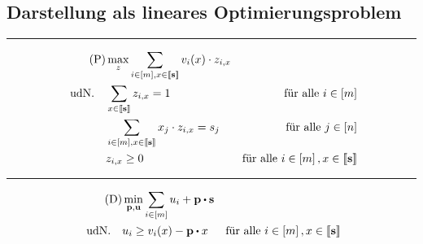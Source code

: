 \subsection{Darstellung als lineares Optimierungsproblem}
\begin{frame}
\begin{lemma}
	\vspace{5pt}
	\hrule
	\begin{align*}
	\tag{P}\label{LP}
	&\max_{z} \sum_{i\in\left[ m \right], x\in\left\llbracket \mathbf{s} \right\rrbracket} v_i(x) \cdot z_{i, x} \\
	\text{udN.} \quad & \sum_{x\in\left\llbracket \mathbf{s} \right\rrbracket} z_{i, x} = 1 & \text{für alle $i\in\left[ m \right]$}\\
	& \sum_{i\in\left[ m \right], x\in\left\llbracket \mathbf{s} \right\rrbracket} x_j \cdot z_{i,x} = s_j & \text{für alle $j\in\left[ n \right]$} \\
	& z_{i, x} \geq 0 &\text{für alle $i\in\left[ m \right], x\in\left\llbracket \mathbf{s} \right\rrbracket$}
	\end{align*}
	\hrule
	\begin{align*}
	\tag{D}\label{DP}
	&\min_{\fp,\fu} \sum_{i\in\first{m}} u_i + \fp \bcdot \fs \\
	\text{udN.} \quad &  u_i \geq v_i(x) - \fp \bcdot x & \text{für alle $i\in\first{m}, x\in\ffirst{\fs}$}
	\end{align*}\vspace{-1.5em}
\end{lemma}
\end{frame}
